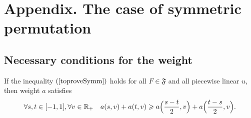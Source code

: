 \section{Appendix. The case of symmetric permutation}

\subsection{Necessary conditions for the weight}

\begin{lm}
If the inequality $(\ref{toproveSymm})$ holds for all $F \in \mathfrak{F}$
and all piecewise linear $u$, then
weight $a$ satisfies
\begin{equation}
\label{almostConvex}
\forall s, t \in [-1, 1], \forall v \in \Real_+ \quad
a( s, v ) + a( t, v ) \ge a\Big( \frac{ s - t }{2}, v \Big) + a\Big( \frac{ t - s }{2}, v \Big).
\end{equation}
\end{lm}

